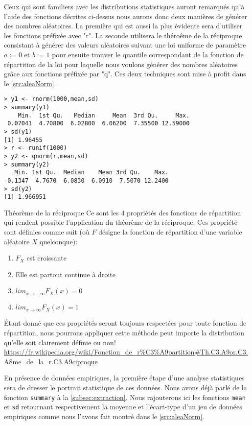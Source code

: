 Ceux qui sont familiers avec les distributions statistiques auront remarqués qu'à l'aide des fonctions décrites ci-dessus nous aurons donc deux manières de générer des nombres aléatoires. La première qui est aussi la plus évidente sera d'utiliser les fonctions préfixée avec "r". La seconde utilisera le théroême de la réciproque consistant à générer des valeurs aléatoires suivant une loi uniforme de paramètre $a := 0$ et $b := 1$ pour ensuite trouver le quantile correspondant de la fonction de répartition de la loi pour laquelle nous voulons générer des nombres aléatoires grâce aux fonctions préfixée par "q". Ces deux techniques sont mise à profit dans le \autoref{src:aleaNorm}. \\

\begin{lstlisting}[caption = Génération de nombres aléatoires,label=src:aleaNorm]
> y1 <- rnorm(1000,mean,sd)
> summary(y1)
    Min.  1st Qu.   Median     Mean  3rd Qu.     Max. 
 0.07041  4.70800  6.02800  6.06200  7.35500 12.59000 
> sd(y1)
[1] 1.96455
> r <- runif(1000)
> y2 <- qnorm(r,mean,sd)
> summary(y2)
   Min. 1st Qu.  Median    Mean 3rd Qu.    Max. 
-0.1347  4.7670  6.0830  6.0910  7.5070 12.2400 
> sd(y2)
[1] 1.966951
\end{lstlisting}

\begin{moreInfo}{Théorème de la réciproque}
	Ce sont les 4 propriétés des fonctions de répartition qui rendent possible l'application du théorème de la réciproque. Ces propriété sont définies comme suit (où $F$ désigne la fonction de répartition d'une variable aléatoire $X$ quelconque):
	\begin{enumerate}
		\item $F_X$ est croissante
		\item Elle est partout continue à droite
		\item $lim_{x \rightarrow -\infty} F_X(x) = 0$
		\item $lim_{x \rightarrow \infty} F_X(x) = 1$
	\end{enumerate}
	Étant donné que ces propriétés seront toujours respectées pour toute fonction de répartition, nous pourrons appliquer cette méthode peut importe la distribution qu'elle soit clairement définie ou non! \\
	\url{https://fr.wikipedia.org/wiki/Fonction_de_r%C3%A9partition#Th.C3.A9or.C3.A8me_de_la_r.C3.A9ciproque}
\end{moreInfo}

En présence de données empiriques, la première étape d'une analyse statistiques sera de dresser le portrait statistique de ces données. Nous avons déjà parlé de la fonction \texttt{summary} à la \autoref{subsec:extraction}. Nous rajouterons ici les fonctions \texttt{mean} et \texttt{sd} retournant respectivement la moyenne et l'écart-type d'un jeu de données empiriques comme nous l'avons fait montré dans le \autoref{src:aleaNorm}. \\

